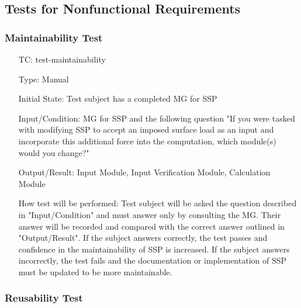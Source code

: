 \documentclass[12pt, titlepage]{article}
\newcounter{testnum} %
\newcommand{\progname}{SSP}
\begin{document}
\subsection{Tests for Nonfunctional Requirements} \label{sec_NFRTests}

\subsubsection{Maintainability Test} \label{sec_Maintainability}

\begin{enumerate}[label=TC\arabic*:,ref={\arabic*}]
	
\item [TC\refstepcounter{testnum}\thetestnum: \label{TC_Maintainability}] 
test-maintainability

Type: Manual
					
Initial State: Test subject has a completed MG for \progname{}
					
Input/Condition: MG for \progname{} and the following question "If you were 
tasked with modifying \progname{} to accept an imposed surface load as an input 
and incorporate this additional force into the computation, which module(s) 
would you change?"
					
Output/Result: Input Module, Input Verification Module, Calculation Module

					
How test will be performed: Test subject will be asked the question described 
in "Input/Condition" and must answer only by consulting the MG. Their answer 
will be recorded and compared with the correct answer outlined in 
"Output/Result". If the subject answers correctly, the test passes and 
confidence in the maintainability of \progname{} is increased. If the subject 
answers incorrectly, the test fails and the documentation or implementation of 
\progname{} must be updated to be more maintainable.
					
\end{enumerate}

\subsubsection{Reusability Test} \label{sec_Reusability}
\end{document}
